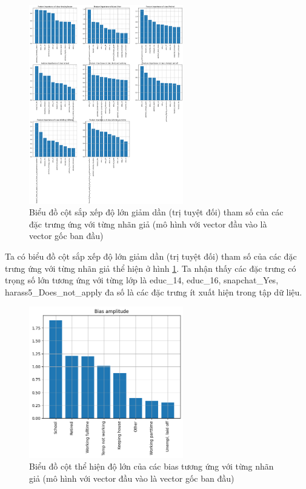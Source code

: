 \begin{enumerate}[label=(\alph*)]
    \begin{figure}[H]
        \centering
        \includegraphics[width=0.6\textwidth]{figures/Thanh/Models/Logistic/With_null_models_Feature_Importance_Logistic_original_features.png}
        \caption{Biểu đồ cột sắp xếp độ lớn giảm dần (trị tuyệt đối) tham số của các đặc trưng ứng với từng nhãn giả (mô hình với vector đầu vào là vector gốc ban đầu)}
        \label{fig:With_null_models_Feature_Importance_Logistic_original_features}
    \end{figure}

    Ta có biểu đồ cột sắp xếp độ lớn giảm dần (trị tuyệt đối) tham số của các đặc trưng ứng với từng nhãn giả thể hiện ở hình \ref{fig:With_null_models_Feature_Importance_Logistic_original_features}.
    Ta nhận thấy các đặc trưng có trọng số lớn tương ứng với từng lớp là educ\_14, educ\_16, snapchat\_Yes, harass5\_Does\_not\_apply đa số là các đặc trưng ít xuất hiện trong tập dữ liệu.

    \begin{figure}[H]
        \centering
        \includegraphics[width=0.6\textwidth]{figures/Thanh/Models/Logistic/With_null_models_Bias_Importance_Logistic_original_features.png}
        \caption{Biểu đồ cột thể hiện độ lớn của các bias tương ứng với từng nhãn giả (mô hình với vector đầu vào là vector gốc ban đầu)}
        \label{fig:With_null_models_Bias_Importance_Logistic_original_features.png}
    \end{figure}


\end{enumerate}
